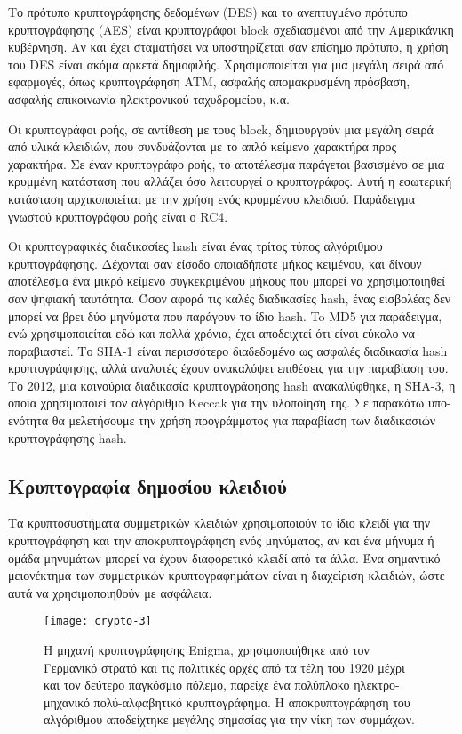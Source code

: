 Το πρότυπο κρυπτογράφησης δεδομένων (DES) και το ανεπτυγμένο πρότυπο κρυπτογράφησης (AES) είναι κρυπτογράφοι block σχεδιασμένοι από την Αμερικάνικη κυβέρνηση. Αν και έχει σταματήσει να υποστηρίζεται σαν επίσημο πρότυπο, η χρήση του DES είναι ακόμα αρκετά δημοφιλής. Χρησιμοποιείται για μια μεγάλη σειρά από εφαρμογές, όπως κρυπτογράφηση ATM, ασφαλής απομακρυσμένη πρόσβαση, ασφαλής επικοινωνία ηλεκτρονικού ταχυδρομείου, κ.α.

Οι κρυπτογράφοι ροής, σε αντίθεση με τους block, δημιουργούν μια μεγάλη σειρά από υλικά κλειδιών, που συνδυάζονται με το απλό κείμενο χαρακτήρα προς χαρακτήρα. Σε έναν κρυπτογράφο ροής, το αποτέλεσμα παράγεται βασισμένο σε μια κρυμμένη κατάσταση που αλλάζει όσο λειτουργεί ο κρυπτογράφος. Αυτή η εσωτερική κατάσταση αρχικοποιείται με την χρήση ενός κρυμμένου κλειδιού. Παράδειγμα γνωστού κρυπτογράφου ροής είναι ο RC4.\cite{cryptography-3}

Οι κρυπτογραφικές διαδικασίες hash είναι ένας τρίτος τύπος αλγόριθμου κρυπτογράφησης. Δέχονται σαν είσοδο οποιαδήποτε μήκος κειμένου, και δίνουν αποτέλεσμα ένα μικρό κείμενο συγκεκριμένου μήκους που μπορεί να χρησιμοποιηθεί σαν ψηφιακή ταυτότητα. Όσον αφορά τις καλές διαδικασίες hash, ένας εισβολέας δεν μπορεί να βρει δύο μηνύματα που παράγουν το ίδιο hash. \cite{cryptography-4}To MD5 για παράδειγμα, ενώ χρησιμοποιείται εδώ και πολλά χρόνια, έχει αποδειχτεί ότι είναι εύκολο να παραβιαστεί. Το SHA-1 είναι περισσότερο διαδεδομένο ως ασφαλές διαδικασία hash κρυπτογράφησης, αλλά αναλυτές έχουν ανακαλύψει επιθέσεις για την παραβίαση του. Το 2012, μια καινούρια διαδικασία κρυπτογράφησης hash ανακαλύφθηκε, η SHA-3, η οποία χρησιμοποιεί τον αλγόριθμο Keccak για την υλοποίηση της. Σε παρακάτω υπο-ενότητα θα μελετήσουμε την χρήση προγράμματος για παραβίαση των διαδικασιών κρυπτογράφησης hash.\cite{cryptography-5}
\subsection{Κρυπτογραφία δημοσίου κλειδιού}
Τα κρυπτοσυστήματα συμμετρικών κλειδιών χρησιμοποιούν το ίδιο κλειδί για την κρυπτογράφηση και την αποκρυπτογράφηση ενός μηνύματος, αν και ένα μήνυμα ή ομάδα μηνυμάτων μπορεί να έχουν διαφορετικό κλειδί από τα άλλα. Ένα σημαντικό μειονέκτημα των συμμετρικών κρυπτογραφημάτων είναι η διαχείριση κλειδιών, ώστε αυτά να χρησιμοποιηθούν με ασφάλεια. 

\begin{figure}[h]
\centering
\texttt{[image: crypto-3]}
\caption{Η μηχανή κρυπτογράφησης Enigma, χρησιμοποιήθηκε από τον Γερμανικό στρατό και τις πολιτικές αρχές από τα τέλη του 1920 μέχρι και τον δεύτερο παγκόσμιο πόλεμο, παρείχε ένα πολύπλοκο ηλεκτρο-μηχανικό πολύ-αλφαβητικό κρυπτογράφημα. H αποκρυπτογράφηση του αλγόριθμου αποδείχτηκε μεγάλης σημασίας για την νίκη των συμμάχων.}
\end{figure}

